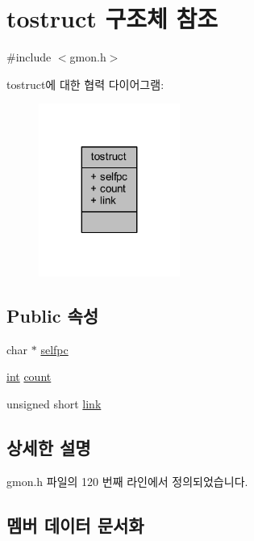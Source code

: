 \hypertarget{structtostruct}{}\section{tostruct 구조체 참조}
\label{structtostruct}


{\ttfamily \#include $<$gmon.\+h$>$}



tostruct에 대한 협력 다이어그램\+:\nopagebreak
\begin{figure}[H]
\begin{center}
\leavevmode
\includegraphics[width=131pt]{structtostruct__coll__graph}
\end{center}
\end{figure}
\subsection*{Public 속성}
\begin{DoxyCompactItemize}
\item 
char $\ast$ \mbox{\hyperlink{structtostruct_a0d2bae308211046a2b1c36b85f611044}{selfpc}}
\item 
\mbox{\hyperlink{_util_8cpp_a0ef32aa8672df19503a49fab2d0c8071}{int}} \mbox{\hyperlink{structtostruct_adeb5d86711902c1a49e2de64dc1704b7}{count}}
\item 
unsigned short \mbox{\hyperlink{structtostruct_a69307956aeadd440e3bc426e1ca7ce9c}{link}}
\end{DoxyCompactItemize}


\subsection{상세한 설명}


gmon.\+h 파일의 120 번째 라인에서 정의되었습니다.



\subsection{멤버 데이터 문서화}
\mbox{\label{structtostruct_adeb5d86711902c1a49e2de64dc1704b7}} 
